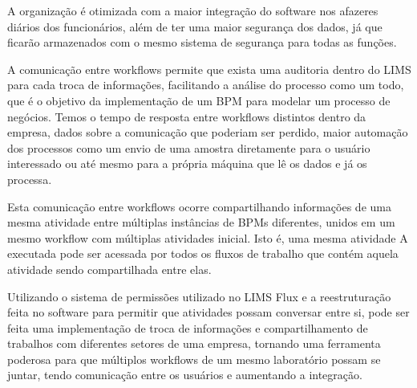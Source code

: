 A organização é otimizada com a maior integração do software nos afazeres diários dos funcionários, além de ter uma maior segurança dos dados, já que ficarão armazenados com o mesmo sistema de segurança para todas as funções.


A comunicação entre workflows permite que exista uma auditoria dentro do LIMS para cada troca de informações, facilitando a análise do processo como um todo, que é o objetivo da implementação de um BPM para modelar um processo de negócios. Temos o tempo de resposta entre workflows distintos dentro da empresa, dados sobre a comunicação que poderiam ser perdido, maior automação dos processos como um envio de uma amostra diretamente para o usuário interessado ou até mesmo para a própria máquina que lê os dados e já os processa.

Esta comunicação entre workflows ocorre compartilhando informações de uma mesma atividade entre múltiplas instâncias de BPMs diferentes, unidos em um mesmo workflow com múltiplas atividades inicial. Isto é, uma mesma atividade A executada pode ser acessada por todos os fluxos de trabalho que contém aquela atividade sendo compartilhada entre elas.

Utilizando o sistema de permissões utilizado no LIMS Flux \R e a reestruturação feita no software para permitir que atividades possam conversar entre si, pode ser feita uma implementação de troca de informações e compartilhamento de trabalhos com diferentes setores de uma empresa, tornando uma ferramenta poderosa para que múltiplos workflows de um mesmo laboratório possam se juntar, tendo comunicação entre os usuários e aumentando a integração.